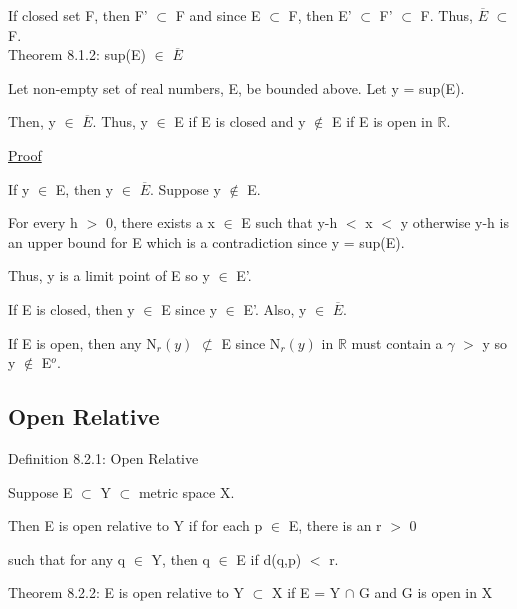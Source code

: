 	If closed set F, then F' $\subset$ F and since E $\subset$ F, then
	E' $\subset$ F' $\subset$ F.
	Thus, $\overline{E}$ $\subset$ F. \\

{ \color{red} Theorem 8.1.2: sup(E) $\in$ $\overline{E}$ }

    \begin{adjustbox}{minipage=14cm, right, vspace=0.1cm 0cm}
        Let non-empty set of real numbers, E, be bounded above.
        Let y = sup(E).
		
		Then, y $\in$ $\overline{E}$.
        Thus, y $\in$ E if E is closed
		and y $\not \in$ E if E is open in $\mathbb{R}$.
    \end{adjustbox}

{ \color{magenta} \underline{Proof} } 
	
	If y $\in$ E, then y $\in$ $\overline{E}$. Suppose y $\not \in$ E.

	For every h $>$ 0, there exists a x $\in$ E such that y-h $<$ x $<$ y
	otherwise y-h is an upper bound for E which is a contradiction
	since y = sup(E).

	Thus, y is a limit point of E so y $\in$ E'.

	If E is closed, then y $\in$ E since y $\in$ E'.	
	Also, y $\in$ $\overline{E}$.
	
	If E is open, then any N$_r(y)$ $\not \subset$ E since 
	N$_r(y)$ in $\mathbb{R}$ must contain a $\gamma$ $>$ y
	so y $\not \in$ E$^o$.





\subsection{ Open Relative }

{ \color{blue} Definition 8.2.1: Open Relative }

	\begin{adjustbox}{minipage=14cm, right, vspace=0.1cm 0cm}
		Suppose E $\subset$ Y $\subset$ metric space X.

		Then E is open relative to Y if for each p $\in$ E, there is an
		r $>$ 0

		such that for any q $\in$ Y, then q $\in$ E if d(q,p) $<$ r. \\
	\end{adjustbox}

\newpage

{ \color{red} Theorem 8.2.2: E is open relative to Y $\subset$ X
if E = Y $\cap$ G and G is open in X} 

